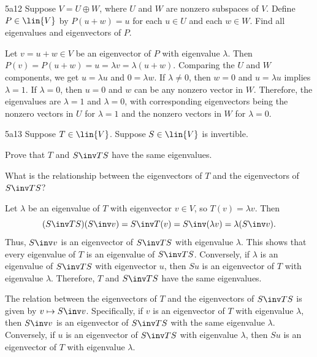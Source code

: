 \begin{exercise}{5a12}
    Suppose $V = U \oplus W$, where $U$ and $W$ are nonzero subspaces of $V$.
	Define $P \in \lin{V}$ by $P(u + w) = u$ for each $u \in U$ and each $w \in W$.
	Find all eigenvalues and eigenvectors of $P$.
\end{exercise}

\begin{sol}
    Let $v = u + w \in V$ be an eigenvector of $P$ with eigenvalue $\lambda$.
	Then $P(v) = P(u + w) = u = \lambda v = \lambda (u + w)$.
	Comparing the $U$ and $W$ components, we get $u = \lambda u$ and $0 = \lambda w$.
	If $\lambda \neq 0$, then $w = 0$ and $u = \lambda u$ implies $\lambda = 1$.
	If $\lambda = 0$, then $u = 0$ and $w$ can be any nonzero vector in $W$.
	Therefore, the eigenvalues are $\lambda = 1$ and $\lambda = 0$, with corresponding eigenvectors being the nonzero vectors in $U$ for $\lambda = 1$ and the nonzero vectors in $W$ for $\lambda = 0$.
\end{sol}

\begin{exercise}{5a13}
    Suppose $T \in \lin{V}$.
	Suppose $S \in \lin{V}$ is invertible.
    \begin{subexercises}
        \item Prove that $T$ and $S\inv TS$ have the same eigenvalues.
        \item What is the relationship between the eigenvectors of $T$ and the eigenvectors of $S\inv TS$?
    \end{subexercises}
\end{exercise}

\begin{solenum}
    \item Let $\lambda$ be an eigenvalue of $T$ with eigenvector $v \in V$, so $T(v) = \lambda v$.
	Then
    \[
    	(S\inv TS)(S\inv v) = S\inv T(v) = S\inv (\lambda v) = \lambda (S\inv v).
    \]
    Thus, $S\inv v$ is an eigenvector of $S\inv TS$ with eigenvalue $\lambda$.
	This shows that every eigenvalue of $T$ is an eigenvalue of $S\inv TS$.
	Conversely, if $\lambda$ is an eigenvalue of $S\inv TS$ with eigenvector $u$, then $S u$ is an eigenvector of $T$ with eigenvalue $\lambda$.
	Therefore, $T$ and $S\inv TS$ have the same eigenvalues.
    \item The relation between the eigenvectors of $T$ and the eigenvectors of $S\inv TS$ is given by $v \mapsto S\inv v$.
	Specifically, if $v$ is an eigenvector of $T$ with eigenvalue $\lambda$, then $S\inv v$ is an eigenvector of $S\inv TS$ with the same eigenvalue $\lambda$.
	Conversely, if $u$ is an eigenvector of $S\inv TS$ with eigenvalue $\lambda$, then $S u$ is an eigenvector of $T$ with eigenvalue $\lambda$.
\end{solenum}


